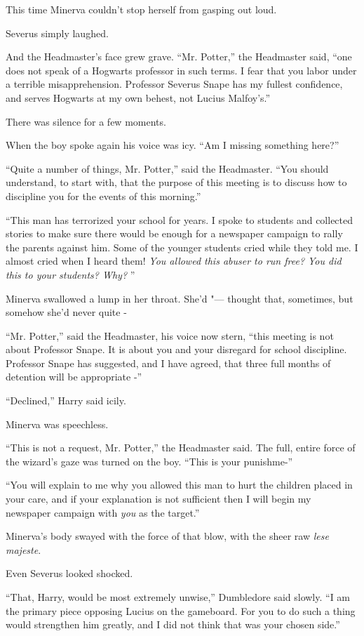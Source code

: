 This time Minerva couldn't stop herself from gasping out loud.

Severus simply laughed.

And the Headmaster's face grew grave. ``Mr. Potter,'' the Headmaster
said, ``one does not speak of a Hogwarts professor in such terms. I fear
that you labor under a terrible misapprehension. Professor Severus Snape
has my fullest confidence, and serves Hogwarts at my own behest, not
Lucius Malfoy's.''

There was silence for a few moments.

When the boy spoke again his voice was icy. ``Am I missing something
here?''

``Quite a number of things, Mr. Potter,'' said the Headmaster. ``You
should understand, to start with, that the purpose of this meeting is to
discuss how to discipline you for the events of this morning.''

``This man has terrorized your school for years. I spoke to students and
collected stories to make sure there would be enough for a newspaper
campaign to rally the parents against him. Some of the younger students
cried while they told me. I almost cried when I heard them! \emph{You
allowed this abuser to run free? You did this to your students? Why?} ''

Minerva swallowed a lump in her throat. She'd "--- thought that, sometimes,
but somehow she'd never quite -

``Mr. Potter,'' said the Headmaster, his voice now stern, ``this meeting
is not about Professor Snape. It is about you and your disregard for
school discipline. Professor Snape has suggested, and I have agreed,
that three full months of detention will be appropriate -''

``Declined,'' Harry said icily.

Minerva was speechless.

``This is not a request, Mr. Potter,'' the Headmaster said. The full,
entire force of the wizard's gaze was turned on the boy. ``This is your
punishme-''

``You will explain to me why you allowed this man to hurt the children
placed in your care, and if your explanation is not sufficient then I
will begin my newspaper campaign with \emph{you} as the target.''

Minerva's body swayed with the force of that blow, with the sheer raw
\emph{lese majeste}.

Even Severus looked shocked.

``That, Harry, would be most extremely unwise,'' Dumbledore said slowly.
``I am the primary piece opposing Lucius on the gameboard. For you to do
such a thing would strengthen him greatly, and I did not think that was
your chosen side.''


